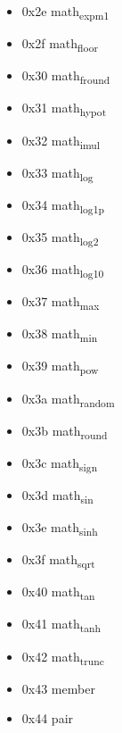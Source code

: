 \begin{itemize}
\item 0x2e math\textsubscript{expm1}

\item 0x2f math\textsubscript{floor}

\item 0x30 math\textsubscript{fround}

\item 0x31 math\textsubscript{hypot}

\item 0x32 math\textsubscript{imul}

\item 0x33 math\textsubscript{log}

\item 0x34 math\textsubscript{log1p}

\item 0x35 math\textsubscript{log2}

\item 0x36 math\textsubscript{log10}

\item 0x37 math\textsubscript{max}

\item 0x38 math\textsubscript{min}

\item 0x39 math\textsubscript{pow}

\item 0x3a math\textsubscript{random}

\item 0x3b math\textsubscript{round}

\item 0x3c math\textsubscript{sign}

\item 0x3d math\textsubscript{sin}

\item 0x3e math\textsubscript{sinh}

\item 0x3f math\textsubscript{sqrt}

\item 0x40 math\textsubscript{tan}

\item 0x41 math\textsubscript{tanh}

\item 0x42 math\textsubscript{trunc}

\item 0x43 member

\item 0x44 pair


\end{itemize}
